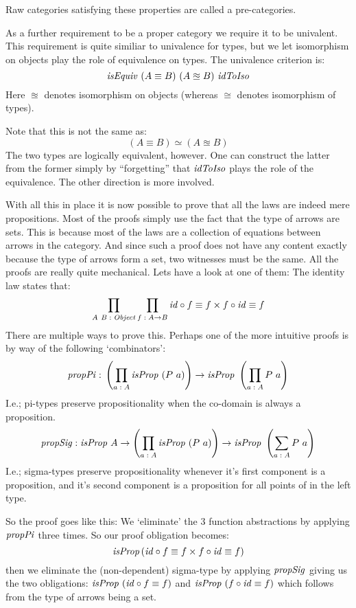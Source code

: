 Raw categories satisfying these properties are called a pre-categories.

As a further requirement to be a proper category we require it to be univalent.
This requirement is quite similiar to univalence for types, but we let
isomorphism on objects play the role of equivalence on types. The univalence
criterion is:
%
$$
\mathit{isEquiv}\ (A \equiv B)\ (A \approxeq B)\ \mathit{idToIso}
$$
%
Here $\approxeq$ denotes isomorphism on objects (whereas $\cong$ denotes
isomorphism of types).

Note that this is not the same as:
%
$$
(A \equiv B) \simeq (A \approxeq B)
$$
%
The two types are logically equivalent, however. One can construct the latter
from the former simply by ``forgetting'' that $\mathit{idToIso}$ plays the role
of the equivalence. The other direction is more involved.

With all this in place it is now possible to prove that all the laws are indeed
mere propositions. Most of the proofs simply use the fact that the type of
arrows are sets. This is because most of the laws are a collection of equations
between arrows in the category. And since such a proof does not have any content
exactly because the type of arrows form a set, two witnesses must be the same.
All the proofs are really quite mechanical. Lets have a look at one of them: The
identity law states that:
%
$$
\prod_{A\ B \;\mathord{:}\; \mathit{Object}} \prod_{f \;\mathord{:}\; A \to B} \mathit{id} \circ f \equiv f \times f \circ \mathit{id} \equiv f
$$
%
There are multiple ways to prove this. Perhaps one of the more intuitive proofs
is by way of the following `combinators':
%
$$
\mathit{propPi} \tp \left(\prod_{a \tp A} \isProp\ (P\ a)\right) \to \isProp\ \left(\prod_{a \tp A} P\ a\right)
$$
%
I.e.; pi-types preserve propositionality when the co-domain is always a
proposition.
%
$$
\mathit{propSig} \;\mathord{:}\; \mathit{isProp}\ A \to \left(\prod_{a \;\mathord{:}\; A} \mathit{isProp}\ (P\ a)\right) \to \mathit{isProp}\ \left(\sum_{a \;\mathord{:}\; A} P\ a\right)
$$
%
I.e.; sigma-types preserve propositionality whenever it's first component is a
proposition, and it's second component is a proposition for all points of in the
left type.

So the proof goes like this: We `eliminate' the 3 function abstractions by
applying $\mathit{propPi}$ three times. So our proof obligation becomes:
%
$$
\mathit{isProp} \left( \mathit{id} \circ f \equiv f \times f \circ \mathit{id} \equiv f \right)
$$
%
then we eliminate the (non-dependent) sigma-type by applying $\mathit{propSig}$ giving
us the two obligations: $\mathit{isProp}\ (\mathit{id} \circ f \equiv f)$ and $\mathit{isProp}\ (f \circ
\mathit{id} \equiv f)$ which follows from the type of arrows being a set.


